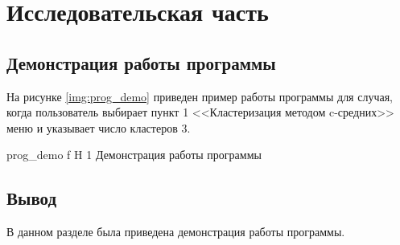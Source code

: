 \chapter{Исследовательская часть}

\section{Демонстрация работы программы}

На рисунке \ref{img:prog_demo} приведен пример работы программы для случая, когда пользователь выбирает пункт 1 <<Кластеризация методом c-средних>> меню и указывает число кластеров 3.

	{prog_demo}
	{f}
	{H}
	{1\textwidth}
	{Демонстрация работы программы}

\section*{Вывод}
В данном разделе была приведена демонстрация работы программы.